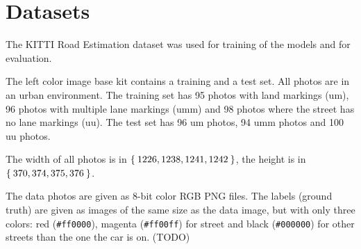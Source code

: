 
\section{Datasets}\label{sec:datasets}
The KITTI Road Estimation dataset \cite{Fritsch2013} was used for training
of the models and for evaluation.

The left color image base kit contains a training and a test set. All photos
are in an urban environment. The training set has 95 photos with land markings
(um), 96 photos with multiple lane markings (umm) and 98 photos where the
street has no lane markings (uu). The test set has 96 um photos, 94 umm photos
and 100 uu photos.

The width of all photos is in $\Set{1226, 1238, 1241, 1242}$, the height is in
$\Set{370, 374, 375, 376}$.

The data photos are given as 8-bit color RGB PNG files. The labels (ground
truth) are given as images of the same size as the data image, but with only
three colors: red (\verb+#ff0000+), magenta (\verb+#ff00ff+) for street and
black (\verb+#000000+) for other streets than the one the car is on. (TODO)